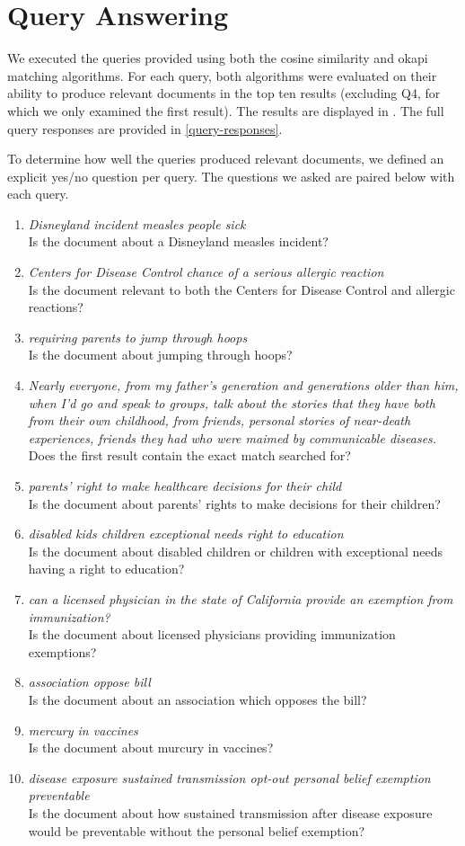 \documentclass[draft]{report}
\newcommand{\query}[2]{\item\textit{#1}\\#2}
\newcommand{\okapi}{okapi }
\newcommand{\cosine}{cosine similarity }
\begin{document}
\section{Query Answering}
We executed the queries provided using both the \cosine and \okapi
matching algorithms. For each query, both algorithms were evaluated on
their ability to produce relevant documents in the top ten results
(excluding Q4, for which we only examined the first result). The
results are displayed in . The full query
responses are provided in \vref{query-responses}.

To determine how well the queries produced relevant documents, we
defined an explicit yes/no question per query. The questions we asked
are paired below with each query.

\begin{enumerate}[Q1:]
  \query{Disneyland incident measles people sick}{Is the document
about a Disneyland measles incident?}

  \query{Centers for Disease Control chance of a serious allergic
reaction}{Is the document relevant to both the Centers for Disease
Control and allergic reactions?}

  \query{requiring parents to jump through hoops}{Is the document
about jumping through hoops?}

  \query{Nearly everyone, from my father's generation and generations
older than him, when I'd go and speak to groups, talk about the
stories that they have both from their own childhood, from friends,
personal stories of near-death experiences, friends they had who were
maimed by communicable diseases.}{Does the first result contain the
exact match searched for?}

  \query{parents' right to make healthcare decisions for their
child}{Is the document about parents' rights to make decisions for
their children?}

  \query{disabled kids children exceptional needs right to
education}{Is the document about disabled children or children with
exceptional needs having a right to education?}

  \query{can a licensed physician in the state of California provide
an exemption from immunization?}{Is the document about licensed
physicians providing immunization exemptions?}

  \query{association oppose bill}{Is the document about an association
which opposes the bill?}

  \query{mercury in vaccines}{Is the document about murcury in
vaccines?}

  \query{disease exposure sustained transmission opt-out personal
belief exemption preventable}{Is the document about how sustained transmission after disease exposure would be preventable without the personal belief exemption?}
\end{enumerate}
\end{document}
